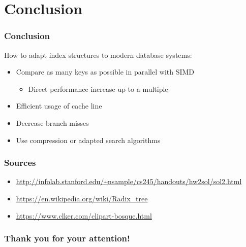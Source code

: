 \documentclass{beamer}
\begin{document}
\section{Conclusion}
\begin{frame}
\frametitle{Conclusion}
How to adapt index structures to modern database systems:
\begin{itemize}
	\item Compare as many keys as possible in parallel with SIMD
	\begin{itemize}
		\item Direct performance increase up to a multiple
	\end{itemize}
	\item Efficient usage of cache line
	\item Decrease branch misses
	\item Use compression or adapted search algorithms
	\end{itemize}
\end{frame}

\begin{frame}
\frametitle{Sources}
\begin{itemize}
	\item \url{http://infolab.stanford.edu/~nsample/cs245/handouts/hw2sol/sol2.html}
	\item \url{https://en.wikipedia.org/wiki/Radix\_tree}
	\item \url{https://www.clker.com/clipart-bosque.html}
\end{itemize}
\end{frame}

\begin{frame}
 \frametitle{Thank you for your attention!}
\end{frame}
\end{document}
